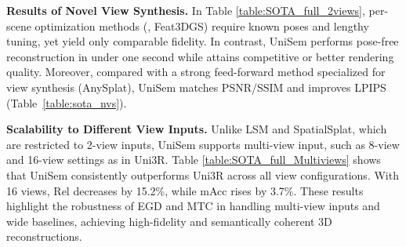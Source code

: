 \documentclass[runningheads]{llncs}
\begin{document}
\noindent
\textbf{Results of Novel View Synthesis.} 
In Table \ref{table:SOTA_full_2views}, per-scene optimization methods (\eg, Feat3DGS) require known poses and lengthy tuning, yet yield only comparable fidelity.  
In contrast, UniSem performs pose-free reconstruction in under one second while attains competitive or better rendering quality. 
Moreover, compared with a strong feed-forward method specialized for view synthesis (AnySplat), UniSem matches PSNR/SSIM and improves LPIPS (Table~\ref{table:sota_nvs}). 




\noindent
\textbf{Scalability to Different View Inputs.} 
Unlike LSM and SpatialSplat, which are restricted to 2-view inputs, UniSem supports multi-view input, such as 8-view and 16-view settings as in Uni3R. 
Table \ref{table:SOTA_full_Multiviews} shows that UniSem consistently outperforms Uni3R across all view configurations. 
With 16 views, Rel decreases by 15.2\%, while mAcc rises by 3.7\%. 
These results highlight the robustness of EGD and MTC in handling multi-view inputs and wide baselines, achieving high-fidelity and semantically coherent 3D reconstructions.  
\end{document}
